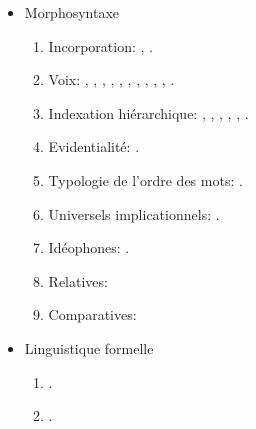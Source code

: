 \documentclass[oneside,a4paper,11pt]{article}
\newcommand{\langue}[2]{#2}
\begin{document}
\begin{itemize}
\begin{itemize}
\item \langue{Morphosyntax}{Morphosyntaxe}
\begin{enumerate}
\item  Incorporation: \citet{jacques11tangut.verb}, \citet{jacques12incorp}.
\item  \langue{Voice}{Voix}:  \citet{jacques07passif}, \citet{jacques10refl}, \citet{jacques12demotion}, \citet{jacques13derivational.khaling}, \citet{jacques13tropative}, \citet{jacques14antipassive}, \citet{jacques15derivational.khaling}, \citet{jacques15causative},  \citet{jacques15spontaneous},  \citealt{jacques16si}, \citet{jacques15generic}.
\item \langue{Hierarchical agreement}{Indexation hiérarchique}:  \citet{jacques10inverse},     \citet{jacques12khaling},   \citet{antonov14rtau}, \citet{jacques14inverse}, \citet{jacques14rtau}, \citet{jacques16th}.
\item \langue{Evidentiality}{Evidentialité}: \citet{jacques14auditory}.
\item \langue{Word-order typology}{Typologie de l'ordre des mots}: \citet{jacques13harmonization}.
\item \langue{Implicational universals}{Universels implicationnels}: \citet{antonov14need}.
\item \langue{Ideophones}{Idéophones}: \citet{japhug14ideophones}.
\item \langue{Relativization}{Relatives}: \citet{jacques16relatives}
\item \langue{Comparative clauses}{Comparatives}: \citet{jacques16comparative}
\end{enumerate}

\item \langue{Formal linguistics}{Linguistique formelle}
\begin{enumerate}
\item \citet{walther14inv.canon}.
\item \citet{walther14compactness}.
\end{enumerate}


\end{itemize}
\end{itemize}
\end{document}
